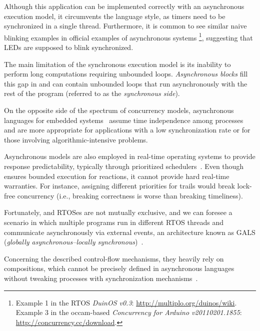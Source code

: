 Although this application can be implemented correctly with an asynchronous 
execution model, it circumvents the language style, as timers need to be 
synchronized in a single thread.
Furthermore, it is common to see similar naive blinking examples in official 
examples of asynchronous systems%
\footnote{
Example 1 in the RTOS \emph{DuinOS v0.3}:
\url{http://multiplo.org/duinos/wiki}.\\
Example 3 in the occam-based \emph{Concurrency for Arduino v20110201.1855}:
\url{http://concurrency.cc/download}.
}, suggesting that LEDs are supposed to blink synchronized.


The main limitation of the synchronous execution model is its inability to 
perform long computations requiring unbounded loops.
\emph{Asynchronous blocks} fill this gap in \CEU{} and can contain unbounded 
loops that run asynchronously with the rest of the program (referred to as the 
\emph{synchronous side}).


On the opposite side of the spectrum of concurrency models, asynchronous 
languages for embedded systems~\cite{wsn.mantisos,arduino.occam}
assume time independence among processes and are more appropriate for 
applications with a low synchronization rate or for those involving
algorithmic-intensive problems.

Asynchronous models are also employed in real-time operating systems to provide 
response predictability, typically through prioritized 
schedulers~\cite{wsn.mantisos,wsn.oses,freertos}.
Even though \CEU ensures bounded execution for reactions, it cannot provide 
hard real-time warranties.
For instance, assigning different priorities for trails would break lock-free 
concurrency (i.e., breaking correctness is worse than breaking timeliness).

Fortunately, \CEU and RTOSes are not mutually exclusive, and we can foresee a 
scenario in which multiple \CEU programs run in different RTOS threads and 
communicate asynchronously via external events, an architecture known as GALS 
(\emph{globally asynchronous--locally synchronous})~\cite{rp.gals}.

Concerning the described control-flow mechanisms, they heavily rely on 
 compositions, which cannot be precisely defined in asynchronous 
languages without tweaking processes with synchronization 
mechanisms~\cite{esterel.preemption}.

